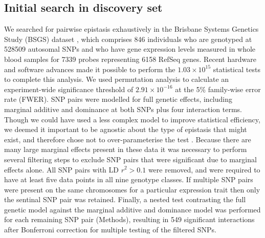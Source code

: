 \documentclass{article}
\begin{document}
\subsection{Initial search in discovery set}
We searched for pairwise epistasis exhaustively in the Brisbane Systems Genetics Study (BSGS) dataset \cite{Powell2012}, which comprises 846 individuals who are genotyped at 528509 autosomal SNPs and who have gene expression levels measured in whole blood samples for 7339 probes representing 6158 RefSeq genes. Recent hardware \cite{Fan:2004:GCH:1048933.1049991} and software \cite{Hemani2011} advances made it possible to perform the $1.03 \times 10^{15}$ statistical tests to complete this analysis. We used permutation analysis \cite{Churchill1994a} to calculate an experiment-wide significance threshold of $2.91 \times 10^{-16}$ at the 5\% family-wise error rate (FWER). SNP pairs were modelled for full genetic effects, including marginal additive and dominance at both SNPs plus four interaction terms. Though we could have used a less complex model to improve statistical efficiency, we deemed it important to be agnostic about the type of epistasis that might exist, and therefore chose not to over-parameterise the test \cite{Marchini2005, Evans2006, Hemani2013}. Because there are many large marginal effects present in these data it was necessary to perform several filtering steps to exclude SNP pairs that were significant due to marginal effects alone. All SNP pairs with LD $r^2 > 0.1$ were removed, and were required to have at least five data points in all nine genotype classes. If multiple SNP pairs were present on the same chromosomes for a particular expression trait then only the sentinal SNP pair was retained. Finally, a nested test contrasting the full genetic model against the marginal additive and dominance model was performed for each remaining SNP pair (Methods), resulting in 549 significant interactions after Bonferroni correction for multiple testing of the filtered SNPs.
\end{document}
